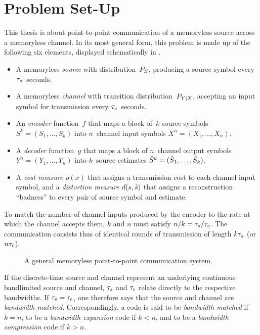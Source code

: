 \section{Problem Set-Up}\label{sec:setup}

This thesis is about point-to-point communication of a memoryless source across
a memoryless channel. In its most general form, this problem is made up of the
following six elements, displayed schematically in .
\begin{itemize}
  \item A memoryless \emph{source} with distribution~${P_S}$, producing a source
    symbol every ${\tau_s}$~seconds.
  \item A memoryless \emph{channel} with transition distribution~$P_{Y|X}$,
    accepting an input symbol for transmission every ${\tau_c}$~seconds.
  \item An \emph{encoder} function~$f$ that maps a block of~$k$ source symbols
    $S^k = (S_1, \dots, S_k)$ into $n$~channel input symbols $X^n = (X_1, \dots,
    X_n)$.
  \item A \emph{decoder} function~$g$ that maps a block of $n$~channel output
    symbols $Y^n = (Y_1, \dots, Y_n)$ into $k$~source estimates ${\hat{S}}^k = ({\hat{S}}_1,
    \dots, {\hat{S}}_k)$.
  \item A \emph{cost measure} $\rho(x)$ that assigns a transmission cost to each
    channel input symbol, and a \emph{distortion measure} $d(s,{\hat{s}})$ that
    assigns a reconstruction ``badness'' to every pair of source symbol and
    estimate.
\end{itemize}
To match the number of channel inputs produced by the encoder to the
rate at which the channel accepts them, $k$ and $n$ must satisfy $n/k = {\tau_s} /
{\tau_c}$. The communication consists thus of identical rounds of transmission of
length $k{\tau_s}$ (or $n{\tau_c}$).



\begin{figure}
  \begin{center}
    
  \end{center}
  \caption{A general memoryless point-to-point communication system.}
  \label{fig:scgen}
\end{figure}

If the discrete-time source and channel represent an underlying continuous
bandlimited source and channel, ${\tau_s}$ and ${\tau_c}$ relate directly to
the respective bandwidths. If ${\tau_s} = {\tau_c}$, one therefore says that the source
and channel are \emph{bandwidth matched}. Correspondingly, a code is said to be
\emph{bandwidth matched} if $k=n$, to be a \emph{bandwidth expansion} code if $k
< n$, and to be a \emph{bandwidth compression} code if $k > n$. 

